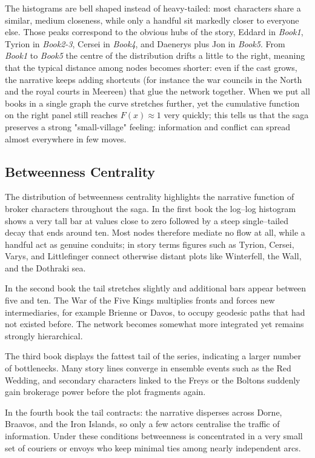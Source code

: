 \documentclass[12pt, a4paper]{article}
\begin{document}
The histograms are bell shaped instead of heavy-tailed: most characters share a similar, medium closeness, while only a handful sit markedly closer to everyone else.  Those peaks correspond to the obvious hubs of the story, Eddard in \emph{Book1}, Tyrion in \emph{Book2-3}, Cersei in \emph{Book4}, and Daenerys plus Jon in \emph{Book5}.
From \emph{Book1} to \emph{Book5} the centre of the distribution drifts a little to the right, meaning that the typical distance among nodes becomes shorter: even if the cast grows, the narrative keeps adding shortcuts (for instance the war councils in the North and the royal courts in Meereen) that glue the network together.
When we put all books in a single graph the curve stretches further, 
yet the cumulative function on the right panel still reaches $F(x)\approx1$ 
very quickly; this tells us that the saga preserves a strong "small-village" feeling: 
information and conflict can spread almost everywhere in  few moves.

\subsection*{Betweenness Centrality}
The distribution of betweenness centrality highlights the narrative function of broker characters throughout the saga. In the first book the log–log histogram shows a very tall bar at values close to zero followed by a steep single–tailed decay that ends around ten. Most nodes therefore mediate no flow at all, while a handful act as genuine conduits; in story terms figures such as Tyrion, Cersei, Varys, and Littlefinger connect otherwise distant plots like Winterfell, the Wall, and the Dothraki sea.

In the second book the tail stretches slightly and additional bars appear between five and ten. The War of the Five Kings multiplies fronts and forces new intermediaries, for example Brienne or Davos, to occupy geodesic paths that had not existed before. The network becomes somewhat more integrated yet remains strongly hierarchical.

The third book displays the fattest tail of the series, indicating a larger number of bottlenecks. Many story lines converge in ensemble events such as the Red Wedding, and secondary characters linked to the Freys or the Boltons suddenly gain brokerage power before the plot fragments again.

In the fourth book the tail contracts: the narrative disperses across Dorne, Braavos, and the Iron Islands, so only a few actors centralise the traffic of information. Under these conditions betweenness is concentrated in a very small set of couriers or envoys who keep minimal ties among nearly independent arcs.
\end{document}

